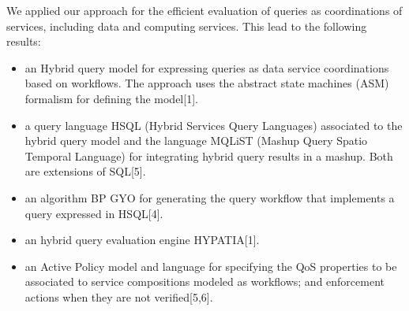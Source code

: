 We  applied our approach for the efficient evaluation of queries as coordinations of services, including data  and computing services.  
This lead to the following results: 
\begin{itemize}
\item  an Hybrid query model for expressing queries as data service coordinations based on workflows. The approach uses the abstract state machines (ASM) formalism for defining the model[1].

\item  a query language HSQL (Hybrid Services Query Languages) associated to the hybrid query model and the language MQLiST (Mashup Query Spatio Temporal Language) for integrating hybrid query results in a mashup. Both are extensions of SQL[5]. 

\item  an algorithm BP GYO for generating the query workflow that implements a query expressed in HSQL[4].


\item an hybrid query evaluation engine HYPATIA[1].

\item an Active Policy model and language for specifying the QoS properties to be associated to service compositions modeled as workflows; and enforcement actions when they are not verified[5,6].

\end{itemize}


